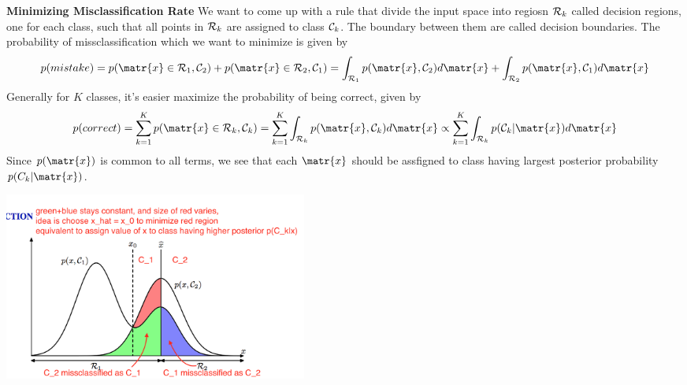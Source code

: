 \documentclass[11pt]{article}
\begin{document}
\begin{defn*}
    \textbf{Minimizing Misclassification Rate} We want to come up with a rule that divide the input space into regiosn $\mathcal{R}_k$ called decision regions, one for each class, such that all points in $\mathcal{R}_k$ are assigned to class $\mathcal{C}_k$. The boundary between them are called decision boundaries. The probability of missclassification which we want to minimize is given by
    \[
        p(mistake) = p(\matr{x}\in \calR_1, \calC_2) + p(\matr{x}\in \calR_2, \calC_1) = \int_{\calR_1} p(\matr{x}, \calC_2) d\matr{x} + \int_{\calR_2} p(\matr{x}, \calC_1) d\matr{x}
    \]
    Generally for $K$ classes, it's easier maximize the probability of being correct, given by 
    \[
        p(correct) = \sum_{k=1}^K p(\matr{x}\in \calR_k, \calC_k) = \sum_{k=1}^K \int_{\calR_k} p(\matr{x}, \calC_k) d\matr{x}  \propto \sum_{k=1}^K \int_{\calR_k} p(\calC_k | \matr{x}) d\matr{x}
    \]
    Since $p(\matr{x})$ is common to all terms, we see that each $\matr{x}$ should be assfigned to class having largest posterior probability $p(C_k | \matr{x})$. 
    \begin{center}
        \includegraphics[width=10cm]{minimize_misclassification.jpg}
    \end{center}
\end{defn*}
\end{document}
